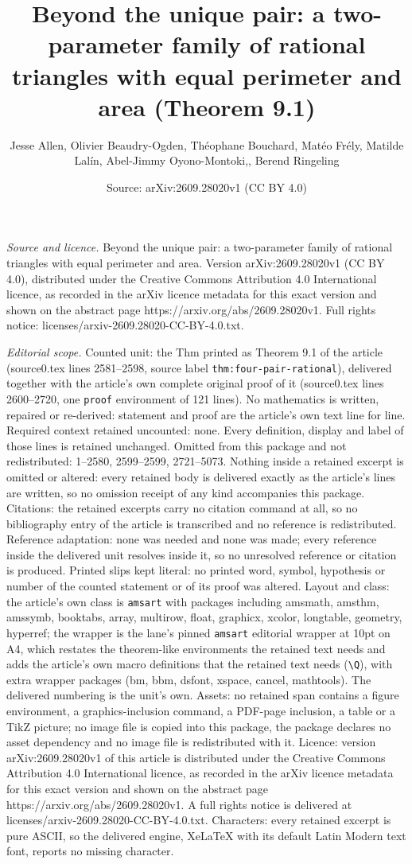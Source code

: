 \documentclass[10pt,a4paper]{amsart}
\title[Beyond the unique pair: a two-parameter family of rational t]{Beyond the unique pair: a two-parameter family of rational triangles with equal perimeter and area (Theorem 9.1)}
\author{Jesse Allen, Olivier Beaudry-Ogden, Th\'eophane Bouchard, Mat\'eo Fr\'ely, Matilde Lal\'in, Abel-Jimmy Oyono-Montoki,, Berend Ringeling}
\date{Source: arXiv:2609.28020v1 (CC BY 4.0)}
\begin{document}
\maketitle

\noindent\emph{Source and licence.} Beyond the unique pair: a two-parameter family of rational triangles with equal perimeter and area. Version arXiv:2609.28020v1 (CC BY 4.0), distributed under the Creative Commons Attribution 4.0 International licence, as recorded in the arXiv licence metadata for this exact version and shown on the abstract page https://arxiv.org/abs/2609.28020v1. Full rights notice: licenses/arxiv-2609.28020-CC-BY-4.0.txt.\par\smallskip

\noindent\textit{Editorial scope.} Counted unit: the Thm printed as Theorem 9.1 of the article (source0.tex lines 2581--2598, source label \texttt{thm:four-pair-rational}), delivered together with the article's own complete original proof of it (source0.tex lines 2600--2720, one \texttt{proof} environment of 121 lines). No mathematics is written, repaired or re-derived: statement and proof are the article's own text line for line. Required context retained uncounted: none. Every definition, display and label of those lines is retained unchanged. Omitted from this package and not redistributed: 1--2580, 2599--2599, 2721--5073. Nothing inside a retained excerpt is omitted or altered: every retained body is delivered exactly as the article's lines are written, so no omission receipt of any kind accompanies this package. Citations: the retained excerpts carry no citation command at all, so no bibliography entry of the article is transcribed and no reference is redistributed. Reference adaptation: none was needed and none was made; every reference inside the delivered unit resolves inside it, so no unresolved reference or citation is produced. Printed slips kept literal: no printed word, symbol, hypothesis or number of the counted statement or of its proof was altered. Layout and class: the article's own class is \texttt{amsart} with packages including amsmath, amsthm, amssymb, booktabs, array, multirow, float, graphicx, xcolor, longtable, geometry, hyperref; the wrapper is the lane's pinned \texttt{amsart} editorial wrapper at 10pt on A4, which restates the theorem-like environments the retained text needs and adds the article's own macro definitions that the retained text needs (\texttt{\textbackslash Q}), with extra wrapper packages (bm, bbm, dsfont, xspace, cancel, mathtools). The delivered numbering is the unit's own. Assets: no retained span contains a figure environment, a graphics-inclusion command, a PDF-page inclusion, a table or a TikZ picture; no image file is copied into this package, the package declares no asset dependency and no image file is redistributed with it. Licence: version arXiv:2609.28020v1 of this article is distributed under the Creative Commons Attribution 4.0 International licence, as recorded in the arXiv licence metadata for this exact version and shown on the abstract page https://arxiv.org/abs/2609.28020v1. A full rights notice is delivered at licenses/arxiv-2609.28020-CC-BY-4.0.txt. Characters: every retained excerpt is pure ASCII, so the delivered engine, XeLaTeX with its default Latin Modern text font, reports no missing character.
\end{document}
